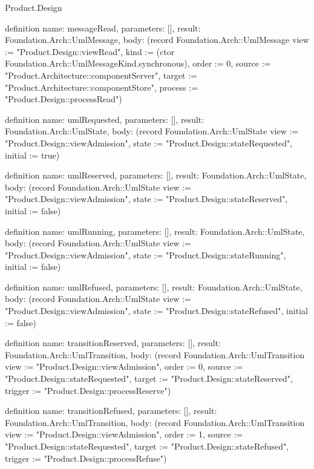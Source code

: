 \begin{lexlean}{Product.Design}
\begin{semanticmodule}
definition{
  name: messageRead, parameters: [], result: Foundation.Arch::UmlMessage,
  body: (record Foundation.Arch::UmlMessage {view := "Product.Design::viewRead", kind := (ctor Foundation.Arch::UmlMessageKind.synchronous), order := 0, source := "Product.Architecture::componentServer", target := "Product.Architecture::componentStore", process := "Product.Design::processRead"})
}

definition{
  name: umlRequested, parameters: [], result: Foundation.Arch::UmlState,
  body: (record Foundation.Arch::UmlState {view := "Product.Design::viewAdmission", state := "Product.Design::stateRequested", initial := true})
}

definition{
  name: umlReserved, parameters: [], result: Foundation.Arch::UmlState,
  body: (record Foundation.Arch::UmlState {view := "Product.Design::viewAdmission", state := "Product.Design::stateReserved", initial := false})
}

definition{
  name: umlRunning, parameters: [], result: Foundation.Arch::UmlState,
  body: (record Foundation.Arch::UmlState {view := "Product.Design::viewAdmission", state := "Product.Design::stateRunning", initial := false})
}

definition{
  name: umlRefused, parameters: [], result: Foundation.Arch::UmlState,
  body: (record Foundation.Arch::UmlState {view := "Product.Design::viewAdmission", state := "Product.Design::stateRefused", initial := false})
}

definition{
  name: transitionReserved, parameters: [], result: Foundation.Arch::UmlTransition,
  body: (record Foundation.Arch::UmlTransition {view := "Product.Design::viewAdmission", order := 0, source := "Product.Design::stateRequested", target := "Product.Design::stateReserved", trigger := "Product.Design::processReserve"})
}

definition{
  name: transitionRefused, parameters: [], result: Foundation.Arch::UmlTransition,
  body: (record Foundation.Arch::UmlTransition {view := "Product.Design::viewAdmission", order := 1, source := "Product.Design::stateRequested", target := "Product.Design::stateRefused", trigger := "Product.Design::processRefuse"})
}


\end{semanticmodule}
\end{lexlean}
